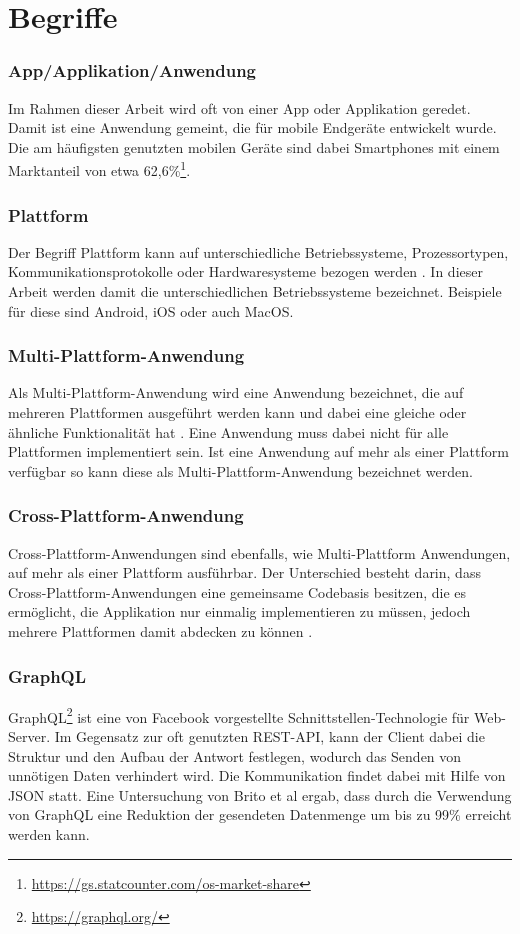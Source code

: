\section{Begriffe}
\subsubsection{App/Applikation/Anwendung}
Im Rahmen dieser Arbeit wird oft von einer App oder Applikation geredet. Damit ist eine Anwendung gemeint, die für mobile Endgeräte entwickelt wurde. Die am häufigsten genutzten mobilen Geräte sind dabei Smartphones mit einem Marktanteil von etwa 62,6\%\footnote{\url{https://gs.statcounter.com/os-market-share}}.

\subsubsection{Plattform}
Der Begriff Plattform kann auf unterschiedliche Betriebssysteme, Prozessortypen, Kommunikationsprotokolle oder Hardwaresysteme bezogen werden \cite{2014Mulit_plattform_definition}. In dieser Arbeit werden damit die unterschiedlichen Betriebssysteme bezeichnet. Beispiele für diese sind Android, iOS oder auch MacOS.

\subsubsection{Multi-Plattform-Anwendung}
Als Multi-Plattform-Anwendung wird eine Anwendung bezeichnet, die auf mehreren Plattformen ausgeführt werden kann und dabei eine gleiche oder ähnliche Funktionalität hat \cite{2014Mulit_plattform_definition}. Eine Anwendung muss dabei nicht für alle Plattformen implementiert sein. Ist eine Anwendung auf mehr als einer Plattform verfügbar so kann diese als Multi-Plattform-Anwendung bezeichnet werden.

\subsubsection{Cross-Plattform-Anwendung}
Cross-Plattform-Anwendungen sind ebenfalls, wie Multi-Plattform Anwendungen, auf mehr als einer Plattform ausführbar. Der Unterschied besteht darin, dass Cross-Plattform-Anwendungen eine gemeinsame Codebasis besitzen, die es ermöglicht, die Applikation nur einmalig implementieren zu müssen, jedoch mehrere Plattformen damit abdecken zu können \cite{2014_Cross_plattform}.

\subsubsection{GraphQL}
GraphQL\footnote{\url{https://graphql.org/}} ist eine von Facebook vorgestellte Schnittstellen-Technologie für Web-Server. Im Gegensatz zur oft genutzten REST-API, kann der Client dabei die Struktur und den Aufbau der Antwort festlegen, wodurch das Senden von unnötigen Daten verhindert wird. Die Kommunikation findet dabei mit Hilfe von JSON statt. Eine Untersuchung von Brito et al \cite{IEEE_GraphQL} ergab, dass durch die Verwendung von GraphQL eine Reduktion der gesendeten Datenmenge um bis zu 99\% erreicht werden kann. 